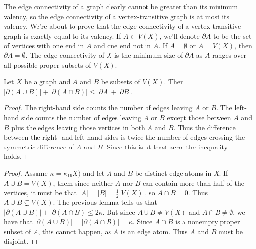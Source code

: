 
The edge connectivity of a graph clearly cannot be greater than its minimum valency, so the edge connectivity of a vertex-transitive graph is at most its valency.  We're about to prove that the edge connectivity of a vertex-transitive graph is exactly equal to its valency.  If $A\subset V(X)$, we'll denote $\partial A$ to be the set of vertices with one end in $A$ and one end not in $A$.  If $A=\emptyset$ or $A=V(X)$, then $\partial A=\emptyset$.  The edge connectivity of $X$ is the minimum size of $\partial A$ as $A$ ranges over all possible proper subsets of $V(X)$.

\begin{lemma}
	Let $X$ be a graph and $A$ and $B$ be subsets of $V(X)$.  Then $|\partial(A\cup B)|+|\partial(A\cap B)|\leq |\partial A|+|\partial B|$.  
\end{lemma} 
\begin{proof}
The right-hand side counts the number of edges leaving $A$ or $B$.  The left-hand side counts the number of edges leaving $A$ or $B$ except those between $A$ and $B$ plus the edges leaving those vertices in both $A$ and $B$.  Thus the difference between the right- and left-hand sides is twice the number of edges crossing the symmetric difference of $A$ and $B$.  Since this is at least zero, the inequality holds.
\end{proof}



\begin{proof}
	Assume $\kappa=\kappa_19X)$ and let $A$ and $B$ be distinct edge atoms in $X$.  If $A\cup B=V(X)$, them since neither $A$ nor $B$ can contain more than half of the vertices, it must be that $|A|=|B|=\frac{1}{2}|V(X)|$, so $A\cap B=0$.  Thus $A\cup B \subsetneq V(X)$.  The previous lemma tells us that $|\partial (A\cup B)|+|\partial (A\cap B) \leq 2\kappa$.  But since $A\cup B\neq V(X)$ and $A\cap B\neq \emptyset$, we have that $|\partial(A\cup B)|=|\partial(A\cap B)|=\kappa$.  Since $A\cap B$ is a nonempty proper subset of $A$, this cannot happen, as $A$ is an edge atom.  Thus $A$ and $B$ must be disjoint.
\end{proof}

